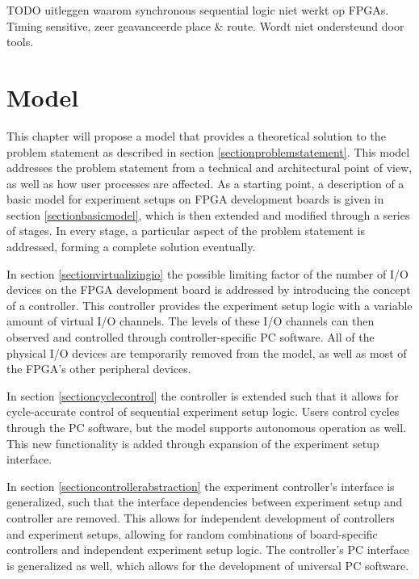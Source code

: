 \documentclass[openright]{template/uva-bachelor-thesis}
\begin{document}
TODO uitleggen waarom synchronous sequential logic niet werkt op FPGAs. Timing sensitive, zeer geavanceerde place \& route. Wordt niet ondersteund door tools. 


% 
% 

\chapter{Model}



This chapter will propose a model that provides a theoretical solution to the problem statement as described in section \ref{sectionproblemstatement}. This model addresses the problem statement from a technical and architectural point of view, as well as how user processes are affected. As a starting point, a description of a basic model for experiment setups on FPGA development boards is given in section \ref{sectionbasicmodel}, which is then extended and modified through a series of stages. In every stage, a particular aspect of the problem statement is addressed, forming a complete solution eventually. 

In section \ref{sectionvirtualizingio} the possible limiting factor of the  number of I/O devices on the FPGA development board is addressed by introducing the concept of a controller. This controller provides the experiment setup logic with a variable amount of virtual I/O channels. The levels of these I/O channels can then observed and controlled through controller-specific PC software. All of the physical I/O devices are temporarily removed from the model, as well as most of the FPGA's other peripheral devices.

In section \ref{sectioncyclecontrol} the controller is extended such that it allows for cycle-accurate control of sequential experiment setup logic. Users control cycles through the PC software, but the model supports autonomous operation as well. This new functionality is added through expansion of the experiment setup interface.

In section \ref{sectioncontrollerabstraction} the experiment controller's interface is generalized, such that the interface dependencies between experiment setup and controller are removed. This allows for independent development of controllers and experiment setups, allowing for random combinations of board-specific controllers and independent experiment setup logic. The controller's PC interface is generalized as well, which allows for the development of universal PC software.
\end{document}
